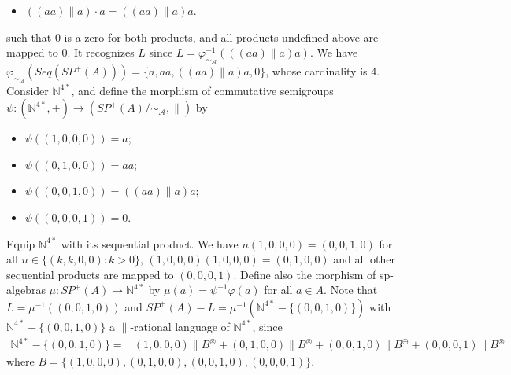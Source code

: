 \documentclass{CSML}
\begin{document}
\begin{exa}
\begin{multicols}{2}
\begin{itemize}
    \item $((aa)\parallel a)\cdot a = ((aa)\parallel a) a$.
  \end{itemize}
  \end{multicols}
  \noindent such that $0$ is a zero for both products, and all products undefined above are mapped to $0$.
  It recognizes $L$ since $L=\varphi_{\sim_{\mathcal{A}}}^{-1}(((aa)\parallel a) a)$.
  We have $\varphi_{\sim_{\mathcal{A}}}(Seq(SP^+(A)))=\{a,aa,((aa)\parallel a) a,0\}$, whose cardinality is 4.
  Consider $\mathbb{N}^{4*}$, and define the morphism of commutative semigroups $\psi:(\mathbb{N}^{4*},+)\to (SP^+(A)/\mathord\sim_\mathcal{A},\parallel)$ by 
  \begin{multicols}{2}
    \begin{itemize}
    \item $\psi((1,0,0,0))=a$;
    \item $\psi((0,1,0,0))=aa$;
    \item $\psi((0,0,1,0))=((aa)\parallel a)a$;
    \item $\psi((0,0,0,1))=0$.
    \end{itemize}
  \end{multicols}

  Equip $\mathbb{N}^{4*}$ with its sequential product. We have $n(1,0,0,0)=(0,0,1,0)$ for all $n\in\{(k,k,0,0) : k>0 \}$, $(1,0,0,0)(1,0,0,0)=(0,1,0,0)$ and all other sequential products are mapped to $(0,0,0,1)$.
  Define also the morphism of sp-algebras $\mu:SP^+(A)\to \mathbb{N}^{4*}$ by $\mu(a)=\psi^{-1}\varphi(a)$ for all $a\in A$. 
  Note that $L=\mu^{-1}((0,0,1,0))$ and $SP^+(A)-L=\mu^{-1}(\mathbb{N}^{4*}-\{(0,0,1,0)\})$ with $\mathbb{N}^{4*}-\{(0,0,1,0)\}$ a $\parallel$-rational language of $\mathbb{N}^{4*}$, since
  \begin{align*}
    \mathbb{N}^{4*}-\{(0,0,1,0)\} =& (1,0,0,0)\parallel B^\circledast + (0,1,0,0)\parallel B^\circledast + (0,0,1,0)\parallel B^\oplus + (0,0,0,1)\parallel B^\circledast
  \end{align*}
  where $B=\{(1,0,0,0),(0,1,0,0),(0,0,1,0),(0,0,0,1)\}$.


\end{exa}
\end{document}
